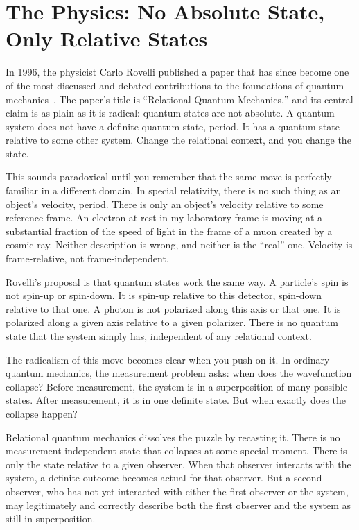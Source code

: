 \section{The Physics: No Absolute State, Only Relative States}
\label{sec:ch9-physics}

In 1996, the physicist Carlo Rovelli published a paper that has since become one of the most discussed and debated contributions to the foundations of quantum mechanics~\citep{Rovelli1996}.
The paper's title is ``Relational Quantum Mechanics,'' and its central claim is as plain as it is radical: quantum states are not absolute.
A quantum system does not have a definite quantum state, period.
It has a quantum state relative to some other system.
Change the relational context, and you change the state.

This sounds paradoxical until you remember that the same move is perfectly familiar in a different domain.
In special relativity, there is no such thing as an object's velocity, period.
There is only an object's velocity relative to some reference frame.
An electron at rest in my laboratory frame is moving at a substantial fraction of the speed of light in the frame of a muon created by a cosmic ray.
Neither description is wrong, and neither is the ``real'' one.
Velocity is frame-relative, not frame-independent.

Rovelli's proposal is that quantum states work the same way.
A particle's spin is not spin-up or spin-down.
It is spin-up relative to this detector, spin-down relative to that one.
A photon is not polarized along this axis or that one.
It is polarized along a given axis relative to a given polarizer.
There is no quantum state that the system simply has, independent of any relational context.

The radicalism of this move becomes clear when you push on it.
In ordinary quantum mechanics, the measurement problem asks: when does the wavefunction collapse?
Before measurement, the system is in a superposition of many possible states.
After measurement, it is in one definite state.
But when exactly does the collapse happen?

Relational quantum mechanics dissolves the puzzle by recasting it.
There is no measurement-independent state that collapses at some special moment.
There is only the state relative to a given observer.
When that observer interacts with the system, a definite outcome becomes actual for that observer.
But a second observer, who has not yet interacted with either the first observer or the system, may legitimately and correctly describe both the first observer and the system as still in superposition.

